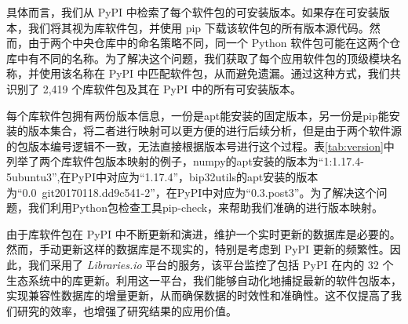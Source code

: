 具体而言，我们从 PyPI 中检索了每个软件包的可安装版本。如果存在可安装版本，我们将其视为库软件包，并使用 pip 下载该软件包的所有版本源代码。然而，由于两个中央仓库中的命名策略不同，同一个 Python 软件包可能在这两个仓库中有不同的名称。为了解决这个问题，我们获取了每个应用软件包的顶级模块名称，并使用该名称在 PyPI 中匹配软件包，从而避免遗漏。通过这种方式，我们共识别了 2,419 个库软件包及其在 PyPI 中的所有可安装版本。

每个库软件包拥有两份版本信息，一份是apt能安装的固定版本，另一份是pip能安装的版本集合，将二者进行映射可以更方便的进行后续分析，但是由于两个软件源的包版本编号逻辑不一致，无法直接根据版本号进行这个过程。表\ref{tab:version}中列举了两个库软件包版本映射的例子，numpy的apt安装的版本为“1:1.17.4-5ubuntu3”,在PyPI中对应为“1.17.4”，bip32utils的apt安装的版本为“0.0~git20170118.dd9c541-2”，在PyPI中对应为“0.3.post3”。为了解决这个问题，我们利用Python包检查工具pip-check，来帮助我们准确的进行版本映射。


由于库软件包在 PyPI 中不断更新和演进，维护一个实时更新的数据库是必要的。然而，手动更新这样的数据库是不现实的，特别是考虑到 PyPI 更新的频繁性。因此，我们采用了 \textit{Libraries.io}  平台的服务，该平台监控了包括 PyPI 在内的 32 个生态系统中的库更新。利用这一平台，我们能够自动化地捕捉最新的软件包版本，实现兼容性数据库的增量更新，从而确保数据的时效性和准确性。这不仅提高了我们研究的效率，也增强了研究结果的应用价值。

